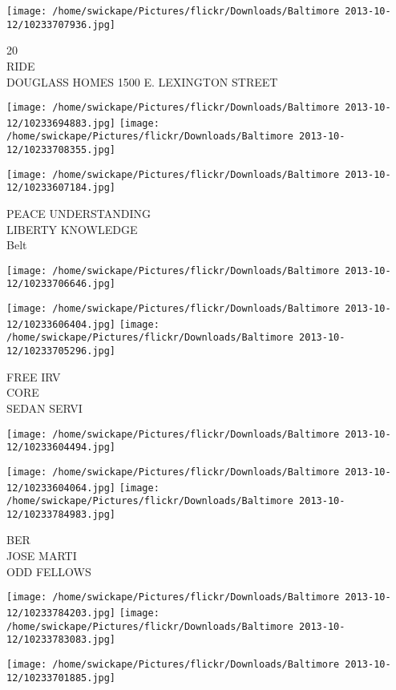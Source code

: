 \documentclass[10pt,letterpaper]{article}
\begin{document}
\vspace{0.25in}
\texttt{[image: /home/swickape/Pictures/flickr/Downloads/Baltimore 2013-10-12/10233707936.jpg]}

20\\
RIDE\\
DOUGLASS HOMES 1500 E. LEXINGTON STREET
\pagebreak

\texttt{[image: /home/swickape/Pictures/flickr/Downloads/Baltimore 2013-10-12/10233694883.jpg]}
\texttt{[image: /home/swickape/Pictures/flickr/Downloads/Baltimore 2013-10-12/10233708355.jpg]}

\vspace{0.25in}
\texttt{[image: /home/swickape/Pictures/flickr/Downloads/Baltimore 2013-10-12/10233607184.jpg]}

PEACE UNDERSTANDING\\
LIBERTY KNOWLEDGE\\
Belt
\pagebreak

\texttt{[image: /home/swickape/Pictures/flickr/Downloads/Baltimore 2013-10-12/10233706646.jpg]}

\vspace{0.25in}
\texttt{[image: /home/swickape/Pictures/flickr/Downloads/Baltimore 2013-10-12/10233606404.jpg]}
\texttt{[image: /home/swickape/Pictures/flickr/Downloads/Baltimore 2013-10-12/10233705296.jpg]}

FREE IRV\\
CORE\\
SEDAN SERVI
\pagebreak

\texttt{[image: /home/swickape/Pictures/flickr/Downloads/Baltimore 2013-10-12/10233604494.jpg]}

\vspace{0.25in}
\texttt{[image: /home/swickape/Pictures/flickr/Downloads/Baltimore 2013-10-12/10233604064.jpg]}
\texttt{[image: /home/swickape/Pictures/flickr/Downloads/Baltimore 2013-10-12/10233784983.jpg]}

BER\\
JOSE MARTI\\
ODD FELLOWS
\pagebreak

\texttt{[image: /home/swickape/Pictures/flickr/Downloads/Baltimore 2013-10-12/10233784203.jpg]}
\texttt{[image: /home/swickape/Pictures/flickr/Downloads/Baltimore 2013-10-12/10233783083.jpg]}

\vspace{0.25in}
\texttt{[image: /home/swickape/Pictures/flickr/Downloads/Baltimore 2013-10-12/10233701885.jpg]}
\end{document}
